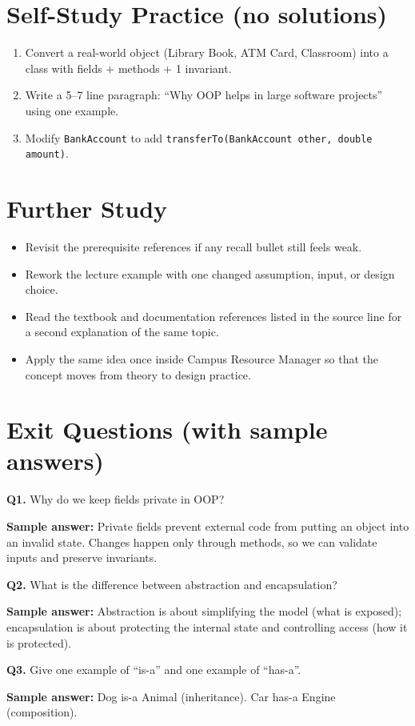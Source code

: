 \documentclass[11pt]{article}
\begin{document}
\section{Self-Study Practice (no solutions)}
\begin{enumerate}
  \item Convert a real-world object (Library Book, ATM Card, Classroom) into a class with fields + methods + 1 invariant.
  \item Write a 5--7 line paragraph: ``Why OOP helps in large software projects'' using one example.
  \item Modify \texttt{BankAccount} to add \texttt{transferTo(BankAccount other, double amount)}.
\end{enumerate}

\section{Further Study}
\begin{itemize}
  \item Revisit the prerequisite references if any recall bullet still feels weak.
  \item Rework the lecture example with one changed assumption, input, or design choice.
  \item Read the textbook and documentation references listed in the source line for a second explanation of the same topic.
  \item Apply the same idea once inside Campus Resource Manager so that the concept moves from theory to design practice.
\end{itemize}
\notesources{\OOPSUnitISources}

\section{Exit Questions (with sample answers)}
\textbf{Q1.} Why do we keep fields private in OOP?\par
\textbf{Sample answer:} Private fields prevent external code from putting an object into an invalid state. Changes happen only through methods, so we can validate inputs and preserve invariants.

\vspace{0.6em}
\textbf{Q2.} What is the difference between abstraction and encapsulation?\par
\textbf{Sample answer:} Abstraction is about simplifying the model (what is exposed); encapsulation is about protecting the internal state and controlling access (how it is protected).

\vspace{0.6em}
\textbf{Q3.} Give one example of ``is-a'' and one example of ``has-a''.\par
\textbf{Sample answer:} Dog is-a Animal (inheritance). Car has-a Engine (composition).
\end{document}
